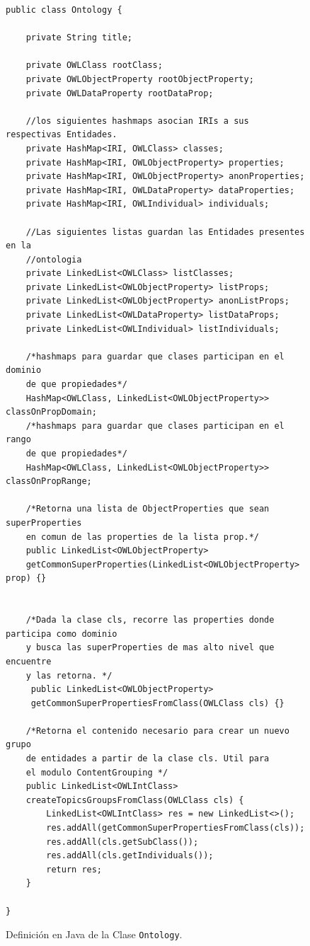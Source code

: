 \begin{figure}
\begin{verbatim}
public class Ontology {

    private String title;

    private OWLClass rootClass;
    private OWLObjectProperty rootObjectProperty;
    private OWLDataProperty rootDataProp;

    //los siguientes hashmaps asocian IRIs a sus respectivas Entidades.
    private HashMap<IRI, OWLClass> classes;
    private HashMap<IRI, OWLObjectProperty> properties;
    private HashMap<IRI, OWLObjectProperty> anonProperties;
    private HashMap<IRI, OWLDataProperty> dataProperties;
    private HashMap<IRI, OWLIndividual> individuals;
    
    //Las siguientes listas guardan las Entidades presentes en la 
    //ontologia
    private LinkedList<OWLClass> listClasses;
    private LinkedList<OWLObjectProperty> listProps;
    private LinkedList<OWLObjectProperty> anonListProps;
    private LinkedList<OWLDataProperty> listDataProps;
    private LinkedList<OWLIndividual> listIndividuals;

    /*hashmaps para guardar que clases participan en el dominio
    de que propiedades*/
    HashMap<OWLClass, LinkedList<OWLObjectProperty>> classOnPropDomain;
    /*hashmaps para guardar que clases participan en el rango
    de que propiedades*/
    HashMap<OWLClass, LinkedList<OWLObjectProperty>> classOnPropRange;

    /*Retorna una lista de ObjectProperties que sean superProperties
    en comun de las properties de la lista prop.*/
    public LinkedList<OWLObjectProperty>
    getCommonSuperProperties(LinkedList<OWLObjectProperty> prop) {}


    /*Dada la clase cls, recorre las properties donde participa como dominio
    y busca las superProperties de mas alto nivel que encuentre 
    y las retorna. */
     public LinkedList<OWLObjectProperty>
     getCommonSuperPropertiesFromClass(OWLClass cls) {}

    /*Retorna el contenido necesario para crear un nuevo grupo
    de entidades a partir de la clase cls. Util para
    el modulo ContentGrouping */
    public LinkedList<OWLIntClass> 
    createTopicsGroupsFromClass(OWLClass cls) {
        LinkedList<OWLIntClass> res = new LinkedList<>();
        res.addAll(getCommonSuperPropertiesFromClass(cls));
        res.addAll(cls.getSubClass());
        res.addAll(cls.getIndividuals());
        return res;
    }

}

\end{verbatim}
\caption{Definición en Java de la Clase \texttt{Ontology}.}
\label{fig:clase_ontology}
\end{figure}


